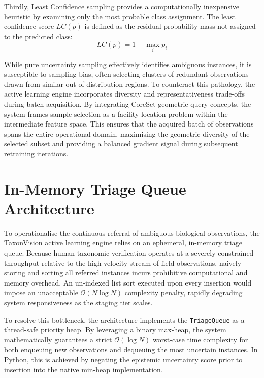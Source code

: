 Thirdly, Least Confidence sampling provides a computationally inexpensive heuristic by examining only the most probable class assignment. The least confidence score $LC(p)$ is defined as the residual probability mass not assigned to the predicted class:
\[
LC(p) = 1 - \max_i p_i
\]

While pure uncertainty sampling effectively identifies ambiguous instances, it is susceptible to sampling bias, often selecting clusters of redundant observations drawn from similar out-of-distribution regions. To counteract this pathology, the active learning engine incorporates diversity and representativeness trade-offs during batch acquisition. By integrating CoreSet geometric query concepts, the system frames sample selection as a facility location problem within the intermediate feature space. This ensures that the acquired batch of observations spans the entire operational domain, maximising the geometric diversity of the selected subset and providing a balanced gradient signal during subsequent retraining iterations.

\section{In-Memory Triage Queue Architecture}
\label{sec:triage_queue}

To operationalise the continuous referral of ambiguous biological observations, the TaxonVision active learning engine relies on an ephemeral, in-memory triage queue. Because human taxonomic verification operates at a severely constrained throughput relative to the high-velocity stream of field observations, naively storing and sorting all referred instances incurs prohibitive computational and memory overhead. An un-indexed list sort executed upon every insertion would impose an unacceptable $\mathcal{O}(N \log N)$ complexity penalty, rapidly degrading system responsiveness as the staging tier scales.

To resolve this bottleneck, the architecture implements the \texttt{TriageQueue} as a thread-safe priority heap. By leveraging a binary max-heap, the system mathematically guarantees a strict $\mathcal{O}(\log N)$ worst-case time complexity for both enqueuing new observations and dequeuing the most uncertain instances. In Python, this is achieved by negating the epistemic uncertainty score prior to insertion into the native min-heap implementation.

